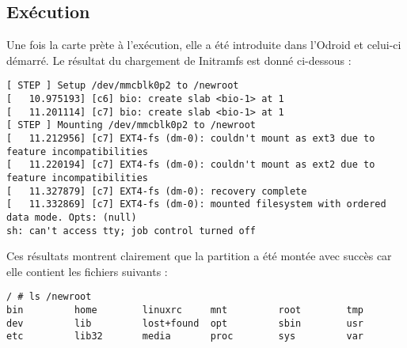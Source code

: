 \subsection{Exécution}
Une fois la carte prète à l'exécution, elle a été introduite dans l'Odroid et celui-ci démarré. Le résultat du chargement de Initramfs est donné ci-dessous :
\begin{lstlisting}[style=Bash]
[ STEP ] Setup /dev/mmcblk0p2 to /newroot
[   10.975193] [c6] bio: create slab <bio-1> at 1
[   11.201114] [c7] bio: create slab <bio-1> at 1
[ STEP ] Mounting /dev/mmcblk0p2 to /newroot
[   11.212956] [c7] EXT4-fs (dm-0): couldn't mount as ext3 due to feature incompatibilities
[   11.220194] [c7] EXT4-fs (dm-0): couldn't mount as ext2 due to feature incompatibilities
[   11.327879] [c7] EXT4-fs (dm-0): recovery complete
[   11.332869] [c7] EXT4-fs (dm-0): mounted filesystem with ordered data mode. Opts: (null)
sh: can't access tty; job control turned off
\end{lstlisting}

Ces résultats montrent clairement que la partition a été montée avec succès car elle contient les fichiers suivants :

\begin{lstlisting}[style=Bash]
/ # ls /newroot
bin         home        linuxrc     mnt         root        tmp
dev         lib         lost+found  opt         sbin        usr
etc         lib32       media       proc        sys         var
\end{lstlisting}

